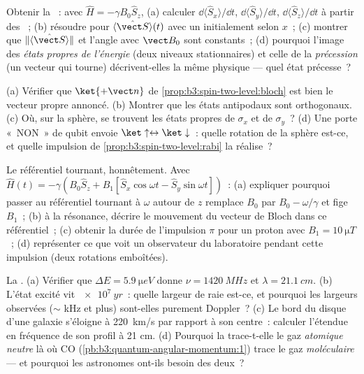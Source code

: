 \begin{exercise}[$\star\star$]\label{exo:b3:spin-two-level:5}
Obtenir la ~: avec $\hat H = -\gamma B_0\hat S_z$, (a)
calculer $\dd\langle\hat S_x\rangle/\dd t$, $\dd\langle\hat
S_y\rangle/\dd t$, $\dd\langle\hat S_z\rangle/\dd t$ à partir des
~; (b) résoudre pour $\langle\hat{\vect S}\rangle(t)$ avec
un  initialement selon $x$~; (c) montrer que
$\|\langle\hat{\vect S}\rangle\|$ et l'angle avec $\vect B_0$ sont
constants~; (d) pourquoi l'image des \emph{états propres de l'énergie}
(deux niveaux stationnaires) et celle de la \emph{précession} (un
vecteur qui tourne) décrivent-elles la même physique --- quel état
précesse~?
\end{exercise}

\begin{exercise}[$\star\star$]\label{exo:b3:spin-two-level:6}
(a) Vérifier que $\ket{+\vect n}$ de
\cref{prop:b3:spin-two-level:bloch} est bien le vecteur propre
annoncé. (b) Montrer que les états antipodaux sont orthogonaux. (c)
Où, sur la sphère, se trouvent les états propres de $\sigma_x$ et de
$\sigma_y$~? (d) Une porte «~NON~» de qubit envoie
$\ket\uparrow \leftrightarrow \ket\downarrow$~: quelle rotation de la
sphère est-ce, et quelle impulsion de
\cref{prop:b3:spin-two-level:rabi} la réalise~?
\end{exercise}

\begin{exercise}[$\star\star$]\label{exo:b3:spin-two-level:7}
Le référentiel tournant, honnêtement. Avec $\hat H(t) = -\gamma(B_0\hat S_z
+ B_1[\hat S_x\cos\omega t - \hat S_y\sin\omega t])$~: (a) expliquer
pourquoi passer au référentiel tournant à $\omega$ autour de $z$
remplace $B_0$ par $B_0 - \omega/\gamma$ et fige $B_1$~; (b) à la
résonance, décrire le mouvement du vecteur de Bloch dans ce
référentiel~; (c) obtenir la durée de l'impulsion $\pi$ pour un proton avec $B_1 =
\qty{10}{\micro T}$~; (d) représenter ce que voit un observateur du
laboratoire pendant cette impulsion (deux rotations emboîtées).
\end{exercise}

\begin{exercise}[$\star\star$]\label{exo:b3:spin-two-level:8}
La . (a) Vérifier que $\Delta E = \qty{5.9}{\micro eV}$
donne $\nu = \qty{1420}{MHz}$ et $\lambda = \qty{21.1}{cm}$. (b)
L'état excité vit $\qty{e7}{yr}$~: quelle largeur de raie est-ce, et
pourquoi les largeurs observées ($\sim$ kHz et plus) sont-elles
purement Doppler~? (c) Le bord du disque d'une galaxie s'éloigne à
\qty{220}{km/s} par rapport à son centre~: calculer l'étendue en
fréquence de son profil à 21 cm. (d) Pourquoi la  trace-t-elle
le gaz \emph{atomique neutre} là où CO
(\cref{pb:b3:quantum-angular-momentum:1}) trace le gaz
\emph{moléculaire} --- et pourquoi les astronomes ont-ils besoin des
deux~?
\end{exercise}

